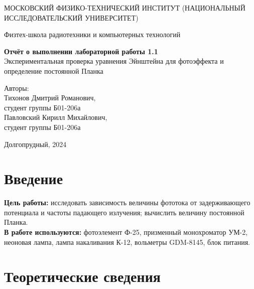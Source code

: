 \documentclass[a4paper, 12pt]{article}
\begin{document}
    \begin{titlepage}
	\begin{center}
            {\large МОСКОВСКИЙ ФИЗИКО-ТЕХНИЧЕСКИЙ ИНСТИТУТ (НАЦИОНАЛЬНЫЙ ИССЛЕДОВАТЕЛЬСКИЙ УНИВЕРСИТЕТ)}
	\end{center}
 
	\begin{center}
		{\large Физтех-школа радиотехники и компьютерных технологий}
	\end{center}
	
	\vspace{8cm}
	{\LARGE
		\begin{center}
                {\bf Отчёт о выполнении лабораторной работы 1.1}\\
                Экспериментальная проверка уравнения Эйнштейна для фотоэффекта и определение постоянной Планка
		\end{center}
	}
	\vspace{4cm}
	\begin{flushright}
		{\Large Авторы: \\ 
        Тихонов Дмитрий Романович, \\ студент группы Б01-206а \\
        Павловский Кирилл Михайлович, \\ студент группы Б01-206а}
	\end{flushright}
	\vspace{4cm}
	\begin{center}
		\Large Долгопрудный, 2024
	\end{center}
    \end{titlepage}


    \section{Введение}

    \noindent \textbf{Цель работы:} исследовать зависимость величины фототока от задерживающего потенциала и частоты падающего излучения; вычислить величину постоянной Планка. \\
	

    \noindent \textbf{В работе используются:} фотоэлемент Ф-25, призменный монохроматор УМ-2, неоновая лампа, лампа накаливания К-12, вольметры GDM-8145, блок питания.
    
    \section{Теоретические сведения}
\end{document}
